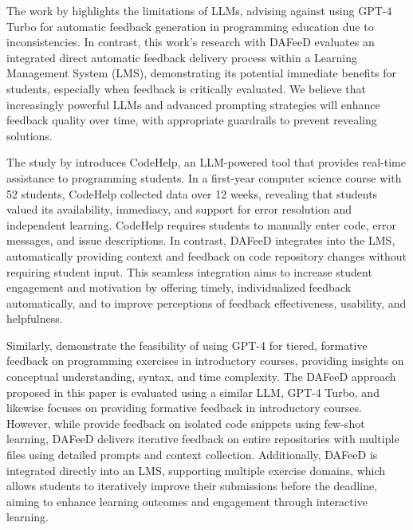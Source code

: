 \documentclass[manuscript,screen,review, anonymous]{acmart}
\begin{document}
The work by \citet{azaiz:2024:FeedbackGenerationProgrammingExercises} highlights the limitations of LLMs, advising against using GPT-4 Turbo for automatic feedback generation in programming education due to inconsistencies.
In contrast, this work's research with DAFeeD evaluates an integrated direct automatic feedback delivery process within a Learning Management System (LMS), demonstrating its potential immediate benefits for students, especially when feedback is critically evaluated.
We believe that increasingly powerful LLMs and advanced prompting strategies will enhance feedback quality over time, with appropriate guardrails to prevent revealing solutions.


The study by \citet{liffiton:2024:CodeHelpUsingLarge} introduces CodeHelp, an LLM-powered tool that provides real-time assistance to programming students.
In a first-year computer science course with 52 students, CodeHelp collected data over 12 weeks, revealing that students valued its availability, immediacy, and support for error resolution and independent learning.
CodeHelp requires students to manually enter code, error messages, and issue descriptions.
In contrast, DAFeeD integrates into the LMS, automatically providing context and feedback on code repository changes without requiring student input.
This seamless integration aims to increase student engagement and motivation by offering timely, individualized feedback automatically, and to improve perceptions of feedback effectiveness, usability, and helpfulness.


Similarly, \citet{nguyen:2024:UsingGPT4Providea} demonstrate the feasibility of using GPT-4 for tiered, formative feedback on programming exercises in introductory courses, providing insights on conceptual understanding, syntax, and time complexity.
The DAFeeD approach proposed in this paper is evaluated using a similar LLM, GPT-4 Turbo, and likewise focuses on providing formative feedback in introductory courses.
However, while \citeauthor{nguyen:2024:UsingGPT4Providea} provide feedback on isolated code snippets using few-shot learning, DAFeeD delivers iterative feedback on entire repositories with multiple files using detailed prompts and context collection.
Additionally, DAFeeD is integrated directly into an LMS, supporting multiple exercise domains, which allows students to iteratively improve their submissions before the deadline, aiming to enhance learning outcomes and engagement through interactive learning.
\end{document}
